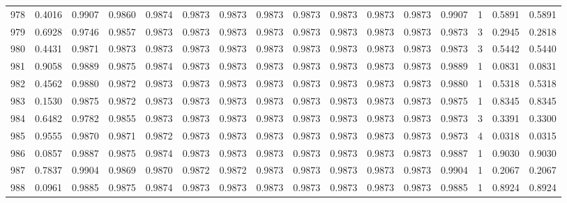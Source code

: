 \begin{tabular}{lrrrrrrrrrrrrrrr}
978 &      0.4016 &  0.9907 &  0.9860 &  0.9874 &  0.9873 &  0.9873 &  0.9873 &  0.9873 &  0.9873 &  0.9873 &   0.9873 &     0.9907 &      1 &                    0.5891 &                     0.5891 \\
979 &      0.6928 &  0.9746 &  0.9857 &  0.9873 &  0.9873 &  0.9873 &  0.9873 &  0.9873 &  0.9873 &  0.9873 &   0.9873 &     0.9873 &      3 &                    0.2945 &                     0.2818 \\
980 &      0.4431 &  0.9871 &  0.9873 &  0.9873 &  0.9873 &  0.9873 &  0.9873 &  0.9873 &  0.9873 &  0.9873 &   0.9873 &     0.9873 &      3 &                    0.5442 &                     0.5440 \\
981 &      0.9058 &  0.9889 &  0.9875 &  0.9874 &  0.9873 &  0.9873 &  0.9873 &  0.9873 &  0.9873 &  0.9873 &   0.9873 &     0.9889 &      1 &                    0.0831 &                     0.0831 \\
982 &      0.4562 &  0.9880 &  0.9872 &  0.9873 &  0.9873 &  0.9873 &  0.9873 &  0.9873 &  0.9873 &  0.9873 &   0.9873 &     0.9880 &      1 &                    0.5318 &                     0.5318 \\
983 &      0.1530 &  0.9875 &  0.9872 &  0.9873 &  0.9873 &  0.9873 &  0.9873 &  0.9873 &  0.9873 &  0.9873 &   0.9873 &     0.9875 &      1 &                    0.8345 &                     0.8345 \\
984 &      0.6482 &  0.9782 &  0.9855 &  0.9873 &  0.9873 &  0.9873 &  0.9873 &  0.9873 &  0.9873 &  0.9873 &   0.9873 &     0.9873 &      3 &                    0.3391 &                     0.3300 \\
985 &      0.9555 &  0.9870 &  0.9871 &  0.9872 &  0.9873 &  0.9873 &  0.9873 &  0.9873 &  0.9873 &  0.9873 &   0.9873 &     0.9873 &      4 &                    0.0318 &                     0.0315 \\
986 &      0.0857 &  0.9887 &  0.9875 &  0.9874 &  0.9873 &  0.9873 &  0.9873 &  0.9873 &  0.9873 &  0.9873 &   0.9873 &     0.9887 &      1 &                    0.9030 &                     0.9030 \\
987 &      0.7837 &  0.9904 &  0.9869 &  0.9870 &  0.9872 &  0.9872 &  0.9873 &  0.9873 &  0.9873 &  0.9873 &   0.9873 &     0.9904 &      1 &                    0.2067 &                     0.2067 \\
988 &      0.0961 &  0.9885 &  0.9875 &  0.9874 &  0.9873 &  0.9873 &  0.9873 &  0.9873 &  0.9873 &  0.9873 &   0.9873 &     0.9885 &      1 &                    0.8924 &                     0.8924 \\

\end{tabular}

